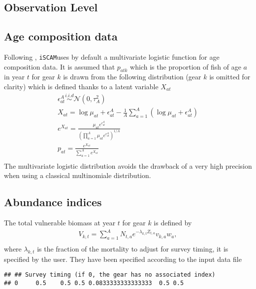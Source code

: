 \documentclass[a4paper]{article}\usepackage{graphicx, color}
\makeatletter
\newenvironment{kframe}{%
 \def\at@end@of@kframe{}%
 \ifinner\ifhmode%
  \def\at@end@of@kframe{\end{minipage}}%
  \begin{minipage}{\columnwidth}%
 \fi\fi%
 \def\FrameCommand##1{\hskip\@totalleftmargin \hskip-\fboxsep
 \colorbox{shadecolor}{##1}\hskip-\fboxsep
     \hskip-\linewidth \hskip-\@totalleftmargin \hskip\columnwidth}%
 \MakeFramed {\advance\hsize-\width
   \@totalleftmargin\z@ \linewidth\hsize
   \@setminipage}}%
 {\par\unskip\endMakeFramed%
 \at@end@of@kframe}
\newenvironment{knitrout}{}{} %
\newcommand{\iscam}{\texttt{iSCAM}}
\makeatother
\begin{document}
\subsection{Observation Level}
\subsection{Age composition data}

Following  \cite{Schnute+95}, \iscam  uses by  default a  multivariate
logistic  function  for  age  composition data.  It  is  assumed  that
$p_{atk}$ which is the  proportion of fish of age $a$  in year $t$ for
gear $k$ is drawn from the following distribution (gear $k$ is omitted
for clarity) which is defined thanks to a latent variable $X_{at}$
\begin{gather}
\epsilon^{A}_{at} \overset{i.i.d}{\sim} \mathcal{N}(0,\tau^2_A)\\
X_{at}       =       \log{\mu_{at}}       +       \epsilon_{at}^A       -
\frac{1}{A}\sum_{a=1}^A\left(\log{\mu_{at}} + \epsilon_{at}^A \right) \\
e^{X_{at}} = \frac{\mu_{at}e^{\epsilon_{at}^A}}{ \left(\prod_{a=1}^A \mu_{at}e^{\epsilon_{at}^A}\right) ^{1/A}}\\
p_{at} = \frac{e^{X_{at}} } {\sum_{a=1}^A e^{X_{at}} }\\
\end{gather}
The multivariate logistic distribution  avoids the drawback of a very high
precision when using a classical multinomiale distribution.

\subsection{Abundance indices}
The total vulnerable biomass at year $t$ for gear $k$ is defined by
\begin{gather}
V_{k,t}=\sum_{a=1}^A N_{t,a} e^{-\lambda_{k,t} Z_{t,a}} v_{k,a} w_a,\\
\end{gather}
 where $\lambda_{k,t}$ is the fraction  of the mortality to adjust for
 survey timing, it is specified by the user. They have been
 specified according to the input data file 
\begin{knitrout}
\color{fgcolor}\begin{kframe}
\begin{verbatim}
## ## Survey timing (if 0, the gear has no associated index)
## 0	 0.5	0.5	0.5	0.0833333333333333	0.5	0.5
\end{verbatim}
\end{kframe}
\end{knitrout}
\end{document}
